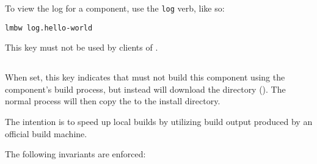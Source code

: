 To view the log for a component, use the \texttt{log} verb, like so:

\begin{verbatim}
lmbw log.hello-world
\end{verbatim}

This key must not be used by clients of \lmsbw.


\subsection{}
\label{variables:build-output-download}

When set, this key indicates that \lmsbw must not build this component
using the component's build process, but instead will download the
\destdir directory ().  The normal
\lmsbw process will then copy the \destdir to the install directory.

The intention is to speed up local builds by utilizing build output
produced by an official build machine.

The following invariants are enforced:

